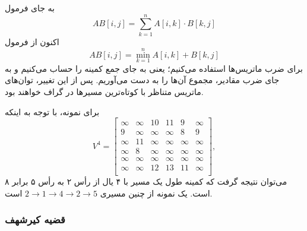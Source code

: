 به جای فرمول
\[
AB[i,j] = \sum_{k=1}^n A[i,k] \cdot B[k,j]
\]
اکنون از فرمول
\[
AB[i,j] = \min_{k=1}^n A[i,k] + B[k,j]
\]
برای ضرب ماتریس‌ها استفاده می‌کنیم؛ یعنی به جای جمع
کمینه را حساب می‌کنیم
و به جای ضرب مقادیر، مجموع آن‌ها را به دست می‌آوریم.
پس از این تغییر،
توان‌های ماتریس متناظر با
کوتاه‌ترین مسیرها در گراف خواهند بود.

برای نمونه، با توجه به اینکه
\[
V^4= \begin{bmatrix}
  \infty & \infty & 10 & 11 & 9 & \infty \\
  9 & \infty & \infty & \infty & 8 & 9 \\
  \infty & 11 & \infty & \infty & \infty & \infty \\
  \infty & 8 & \infty & \infty & \infty & \infty \\
  \infty & \infty & \infty & \infty & \infty & \infty \\
  \infty & \infty & 12 & 13 & 11 & \infty \\
 \end{bmatrix},
\]
می‌توان نتیجه گرفت که کمینه طول یک مسیر
با ۴ یال
از رأس ۲ به رأس ۵ برابر ۸ است.
یک نمونه از چنین مسیری
$2 \rightarrow 1 \rightarrow 4 \rightarrow 2 \rightarrow 5$
است.

\subsubsection{قضیه کیرشهف}


